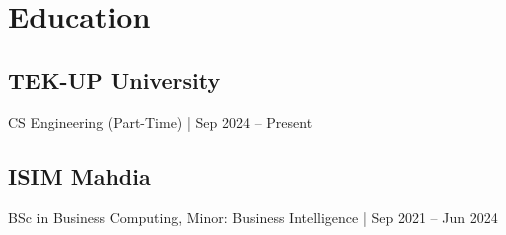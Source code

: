 \documentclass[11pt]{article}
\begin{document}
\section*{Education}
\subsection*{TEK-UP University}
CS Engineering (Part-Time) | Sep 2024 – Present

\subsection*{ISIM Mahdia}
BSc in Business Computing, Minor: Business Intelligence | Sep 2021 – Jun 2024
\end{document}

